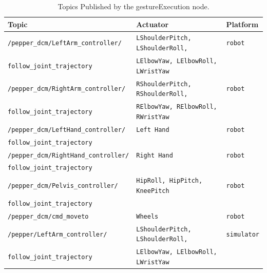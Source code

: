 \documentclass{CSSRforAfrica}
\begin{document}
\begin{longtable}[c]{|l|l|l|}
    \caption{Topics Published by the gestureExecution node.} \label{tab:Published_topics} \\
    \hline
    \rowcolor{gray!30}
    \footnotesize{\textbf{Topic}} & \footnotesize{\textbf{Actuator}} & \footnotesize{\textbf{Platform}} \\ \hline
    \endhead %
    
    \footnotesize{\texttt{/pepper\_dcm/LeftArm\_controller/}} & \footnotesize{\texttt{LShoulderPitch, LShoulderRoll,}} & \footnotesize{\texttt{robot}} \\ 
\footnotesize{\texttt{follow\_joint\_trajectory}} & \footnotesize{\texttt{LElbowYaw, LElbowRoll, LWristYaw}} & \footnotesize{} \\ \hline

    \footnotesize{\texttt{/pepper\_dcm/RightArm\_controller/}} & \footnotesize{\texttt{RShoulderPitch, RShoulderRoll,}} & \footnotesize{\texttt{robot}} \\ 
\footnotesize{\texttt{follow\_joint\_trajectory}} & \footnotesize{\texttt{RElbowYaw, RElbowRoll, RWristYaw}} & \footnotesize{} \\ \hline

    \footnotesize{\texttt{/pepper\_dcm/LeftHand\_controller/}} & \footnotesize{\texttt{Left Hand}} & \footnotesize{\texttt{robot}} \\ 
\footnotesize{\texttt{follow\_joint\_trajectory}} & \footnotesize{} & \footnotesize{} \\ \hline

    \footnotesize{\texttt{/pepper\_dcm/RightHand\_controller/}} & \footnotesize{\texttt{Right Hand}} & \footnotesize{\texttt{robot}} \\ 
\footnotesize{\texttt{follow\_joint\_trajectory}} & \footnotesize{} & \footnotesize{} \\ \hline

    \footnotesize{\texttt{/pepper\_dcm/Pelvis\_controller/}} & \footnotesize{\texttt{HipRoll, HipPitch, KneePitch}} & \footnotesize{\texttt{robot}} \\ 
\footnotesize{\texttt{follow\_joint\_trajectory}} & \footnotesize{} & \footnotesize{} \\ \hline

    \footnotesize{\texttt{/pepper\_dcm/cmd\_moveto}} & \footnotesize{\texttt{Wheels}} & \footnotesize{\texttt{robot}} \\ \hline

    \footnotesize{\texttt{/pepper/LeftArm\_controller/}} & \footnotesize{\texttt{LShoulderPitch, LShoulderRoll,}} & \footnotesize{\texttt{simulator}} \\ 
\footnotesize{\texttt{follow\_joint\_trajectory}} & \footnotesize{\texttt{LElbowYaw, LElbowRoll, LWristYaw}} & \footnotesize{} \\ \hline


\end{longtable}
\end{document}
